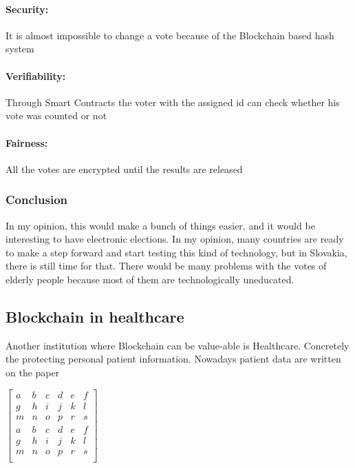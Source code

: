 \documentclass[10pt,english,a4paper]{article}
\begin{document}
\paragraph{Security:}
It is almost impossible to change a vote because of the Blockchain based hash system
\cite{Alvi:E-voting}
\paragraph{Verifiability:}
Through Smart Contracts the voter with the assigned id can check whether his vote was counted or not
\cite{Alvi:E-voting}
\paragraph{Fairness:}
All the votes are encrypted until the results are released
\cite{Alvi:E-voting}



\subsubsection{Conclusion}
In my opinion, this would make a bunch of things easier, and it would be interesting to have electronic elections. In my opinion, many countries are ready to make a step forward and start testing this kind of technology, but in Slovakia, there is still time for that. There would be many problems with the votes of elderly people because most of them are technologically uneducated.

\subsection{Blockchain in healthcare}
Another institution where Blockchain can be value-able is Healthcare. Concretely the protecting personal patient information. Nowadays patient data are written on the paper 
\cite{Ramar:Healthcare}

 
$\begin{bmatrix}
  a & b & c & d & e &f\\
  g & h & i & j & k &l \\
  m & n & o & p & r &s\\
   a & b & c & d & e &f\\
  g & h & i & j & k &l \\
  m & n & o & p & r &s\\
  

  
\end{bmatrix}$



\newpage


\end{document}
